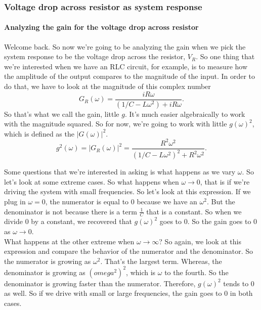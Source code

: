\subsubsection{Voltage drop across resistor as system response}

\paragraph{Analyzing the gain for the voltage drop across resistor}

Welcome back.
So now we're going to be analyzing the gain when
we pick the system response to be the voltage drop
across the resistor, $V _R$.
So one thing that we're interested when
we have an RLC circuit, for example,
is to measure how the amplitude of the output
compares to the magnitude of the input.
In order to do that, we have to look at the magnitude
of this complex number
\begin{equation*}
  G _R(\omega) = \frac{iR \omega}{(1/C - L \omega ^2) + iR\omega}. 
\end{equation*}
So that's what we call the gain, little $g$.
It's much easier algebraically to work
with the magnitude squared.
So for now, we're going to work with little $g(\omega)^2$, which
is defined as the $|G(\omega)| ^2$.
\begin{equation*}
  g^2 (\omega) = |G _R(\omega)| ^2 =
  \frac{R^2 \omega^2}{(1/C - L\omega^2)^2 + R^2 \omega^2}. 
\end{equation*}

Some questions that we're interested in asking
is what happens as we vary $\omega$.
So let's look at some extreme cases.
So what happens when $\omega \to 0$,
that is if we're driving the system with small frequencies.
So let's look at this expression.
If we plug in $\omega = 0$, the numerator is equal to $0$
because we have an $\omega ^2$.
But the denominator is not because there is a term $\frac{1}{C}$
that is a constant.
So when we divide $0$ by a constant,
we recovered that $g(\omega) ^2$ goes to $0$.
So the gain goes to $0$ as $\omega \to 0$.\\

What happens at the other extreme
when $\omega \to \infty$?
So again, we look at this expression
and compare the behavior of the numerator and the denominator.
So the numerator is growing as $\omega ^2$.
That's the largest term.
Whereas, the denominator is growing as $(omega ^2)^2$,
which is $\omega$ to the fourth.
So the denominator is growing faster than the numerator.
Therefore, $g(\omega)^2$ tends to $0$ as well.
So if we drive with small or large frequencies,
the gain goes to $0$ in both cases.\\


